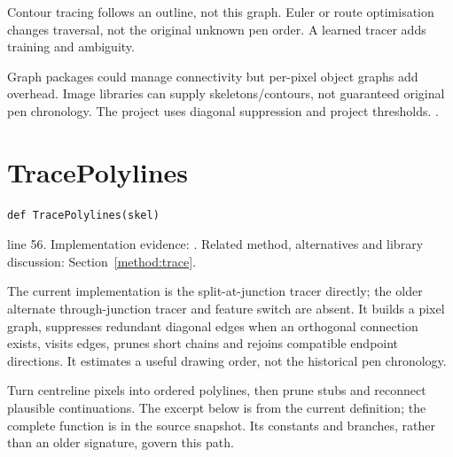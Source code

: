 Contour tracing follows an outline, not this graph. Euler or route optimisation changes traversal, not the original unknown pen order. A learned tracer adds training and ambiguity.


Graph packages could manage connectivity but per-pixel object graphs add overhead. Image libraries can supply skeletons/contours, not guaranteed original pen chronology. The project uses diagonal suppression and project thresholds. \cite{zhangsuen1984,code2026}.


\section{TracePolylines}\label{fn:style:TracePolylines}
\begin{lstlisting}[style=sig]
def TracePolylines(skel)
\end{lstlisting}
 line 56. Implementation evidence: \cite{code2026}. Related method, alternatives and library discussion: Section~\ref{method:trace}.


The current implementation is the split-at-junction tracer directly; the older alternate through-junction tracer and feature switch are absent. It builds a pixel graph, suppresses redundant diagonal edges when an orthogonal connection exists, visits edges, prunes short chains and rejoins compatible endpoint directions. It estimates a useful drawing order, not the historical pen chronology.


Turn centreline pixels into ordered polylines, then prune stubs and reconnect plausible continuations. The excerpt below is from the current definition; the complete function is in the source snapshot. Its constants and branches, rather than an older signature, govern this path.


